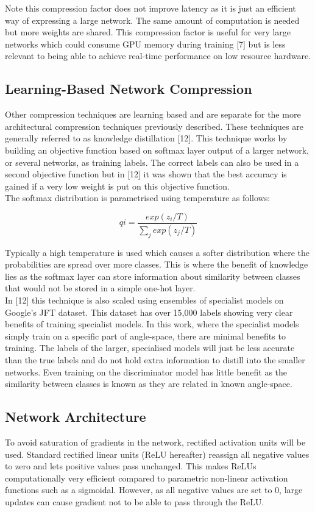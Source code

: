\documentclass{article}
\begin{document}
Note this compression factor does not improve latency as it is just an efficient way of expressing a large network. The same amount of computation is needed but more weights are shared. This compression factor is useful for very large networks which could consume GPU memory during training [7] but is less relevant to being able to achieve real-time performance on low resource hardware. 

\subsection*{Learning-Based Network Compression}
Other compression techniques are learning based and are separate for the more architectural compression techniques previously described. These techniques are generally referred to as knowledge distillation [12]. This technique works by building an objective function based on softmax layer output of a larger network, or several networks, as training labels. The correct labels can also be used in a second objective function but in [12] it was shown that the best accuracy is gained if a very low weight is put on this objective function.\\

The softmax distribution is parametrised using temperature as follows:

\[qi = \frac{exp(z_i/T)}{\sum_j exp(z_j/T)}\]

Typically a high temperature is used which causes a softer distribution where the probabilities are spread over more classes. This is where the benefit of knowledge lies as the softmax layer can store information about similarity between classes that would not be stored in a simple one-hot layer.\\

In [12] this technique is also scaled using ensembles of specialist models on Google's JFT dataset. This dataset has over 15,000 labels showing very clear benefits of training specialist models. In this work, where the specialist models simply train on a specific part of angle-space, there are minimal benefits to training. The labels of the larger, specialised models will just be less accurate than the true labels and do not hold extra information to distill into the smaller networks. Even training on the discriminator model has little benefit as the similarity between classes is known as they are related in known angle-space.

\subsection*{Network Architecture}
To avoid saturation of gradients in the network, rectified activation units will be used. Standard rectified linear units (ReLU hereafter) reassign all negative values to zero and lets positive values pass unchanged. This makes ReLUs computationally very efficient compared to parametric non-linear activation functions such as a sigmoidal. However, as all negative values are set to 0, large updates can cause gradient not to be able to pass through the ReLU.\\
\end{document}
